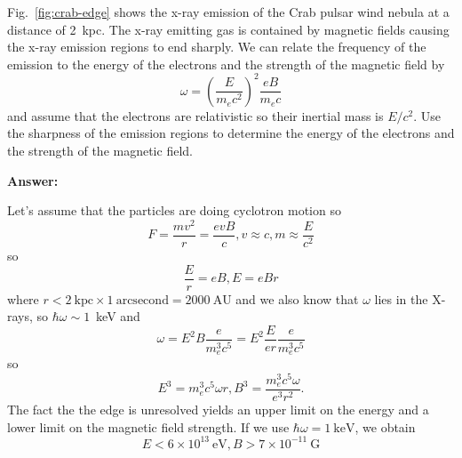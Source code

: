 \documentclass{article}
\begin{document}
\begin{enumerate}
  Fig.~\ref{fig:crab-edge} shows the x-ray emission of the Crab pulsar
  wind nebula at a distance of 2~kpc.  The x-ray emitting gas is
  contained by magnetic fields causing the x-ray emission regions to
  end sharply.  We can relate the frequency of the emission to the energy
  of the electrons and the strength of the magnetic field by
\begin{equation}
\omega = \left ( \frac{E}{m_e c^2}
\right )^2 \frac{e B}{m_e c} 
\end{equation}
and assume that the electrons are relativistic so their inertial mass
is $E/c^2$.  Use the sharpness of the emission
regions to determine the energy of the electrons and the strength of
the magnetic field.

{\bf Answer:}

Let's assume that the particles are doing cyclotron motion so
\begin{equation}
F = \frac{m v^2}{r} = \frac{ e v B}{c}, v\approx c, m\approx
\frac{E}{c^2}
\end{equation}
so
$$
\frac{E}{r} = e B, E = e B r
$$
where $r < 2~\mathrm{kpc} \times 1~\mathrm{arcsecond} = 2000~\mathrm{AU}$
and we also know that $\omega$ lies in the X-rays, so $\hbar \omega \sim
1$~keV and
$$
\omega = E^2 B \frac{e}{m_e^3 c^5} = E^2 \frac{E}{er} \frac{e}{m_e^3 c^5}
$$
so
$$
E^3 = m_e^3 c^5 \omega r, B^3 = \frac{m_e^3 c^5 \omega}{e^3 r^2}.
$$
The fact the the edge is unresolved yields an upper limit on the energy
and a lower limit on the magnetic field strength.  If we use $\hbar
\omega=1~\mathrm{keV}$, we obtain
$$
E < 6 \times 10^{13}~\mathrm{eV}, B > 7 \times 10^{-11}~\mathrm{G}
$$



\end{enumerate}
\end{document}
